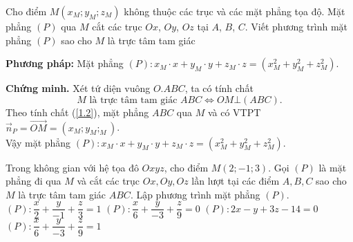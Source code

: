 \begin{dang}{}
	{Cho điểm $ M(x_M;y_M;z_M) $ không thuộc các trục và các mặt phẳng tọa độ. Mặt phẳng $ (P) $ qua $ M $ cắt các trục $ Ox $, $ Oy $, $ Oz $ tại $ A $, $ B $, $ C $. Viết phương trình mặt phẳng $ (P) $ sao cho $ M $ là trực tâm tam giác}
	
	\textbf{Phương pháp:} Mặt phẳng $ (P)\colon x_M\cdot x+ y_M\cdot y+ z_M\cdot z = (x_M^2+y_M^2+z_M^2)$.
	
	\textbf{Chứng minh.} Xét tứ diện vuông $ O.ABC $, ta có tính chất
	\begin{equation}\label{1.2}
	M \text{ là trực tâm tam giác }ABC \Leftrightarrow OM\bot(ABC).	
	\end{equation}
	Theo tính chất (\ref{1.2}), mặt phẳng $ ABC $ qua $ M $ và có VTPT $ \overrightarrow{n}_P=\overrightarrow{OM}=(x_M;y_M;_M) $.\\
	Vậy mặt phẳng $ (P)\colon x_M\cdot x+ y_M\cdot y+ z_M\cdot z = (x_M^2+y_M^2+z_M^2)$.
\end{dang}

\begin{vd}
	Trong không gian với hệ tọa đô $Oxyz$, cho điểm $M(2;-1;3)$. Gọi $(P)$ là mặt phẳng đi qua $M$ và cắt các trục $Ox,Oy,Oz$ lần lượt tại các điểm $A,B,C$ sao cho  $ M $ là trực tâm tam giác $ ABC $. Lập phương trình mặt phẳng $(P)$.
	\choice
	{$(P)\colon \dfrac{x}{2}+\dfrac{y}{-1}+\dfrac{z}{3}=1$}
	{$(P)\colon \dfrac{x}{6}+\dfrac{y}{-3}+\dfrac{z}{9}=0$}
	{$(P)\colon 2x-y+3z-14=0$}
	{\True $(P)\colon \dfrac{x}{6}+\dfrac{y}{-3}+\dfrac{z}{9}=1$}
\end{vd}


